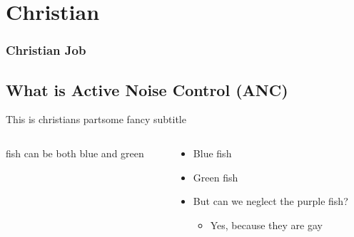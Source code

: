 \section{Christian}
\begin{frame}
	\frametitle{Christian Job}
	\tableofcontents[currentsection]
\end{frame}
\subsection{What is Active Noise Control (ANC)}
\begin{frame}{This is christians part}{some fancy subtitle}		
	\begin{columns}
		\begin{column}{0.5\textwidth}
		fish can be both blue and green	
		\end{column}
		\begin{column}{0.5\textwidth} 
		\begin{itemize}
			\item<1-> Blue fish
			\item<2-> Green fish
			\item<3-> But can we neglect the purple fish?
			\begin{itemize}
				\item<4-> Yes, because they are gay
			\end{itemize}			
		\end{itemize}		
		\end{column}
	\end{columns}
\end{frame}